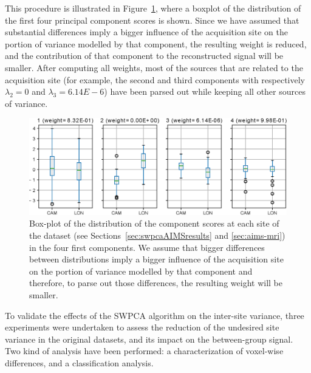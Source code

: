 This procedure is illustrated in Figure~\ref{fig:swpcaboxplot}, where a boxplot of the distribution of the first four principal component scores is shown. Since we have assumed that substantial differences imply a bigger influence of the acquisition site on the portion of variance modelled by that component, the resulting weight is reduced, and the contribution of that component to the reconstructed signal will be smaller. After computing all weights, most of the sources that are related to the acquisition site (for example, the second and third components with respectively $\lambda_2=0$ and $\lambda_3=6.14E-6$) have been parsed out while keeping all other sources of variance.

\begin{figure}
	\centering
	\includegraphics[width=\linewidth]{Graphics/ch7/FIGURE02}
	\caption[Box-plot of the distribution of the component scores at each site of the \aimsmri{} dataset (see Sections~\ref{sec:swpcaAIMSresults} and \ref{sec:aims-mri}) in the four first components.]{Box-plot of the distribution of the component scores at each site of the \aimsmri{} dataset (see Sections~\ref{sec:swpcaAIMSresults} and \ref{sec:aims-mri}) in the four first components. We assume that bigger differences between distributions imply a bigger influence of the acquisition site on the portion of variance modelled by that component and therefore, to parse out those differences, the resulting weight will be smaller.}
	\label{fig:swpcaboxplot}
\end{figure}

\label{sec:swpcaEval}
To validate the effects of the \ac{SWPCA} algorithm on the inter-site variance, three experiments were undertaken to assess the reduction of the undesired site variance in the original datasets, and its impact on the between-group signal. Two kind of analysis have been performed: a characterization of voxel-wise differences, and a classification analysis. 

